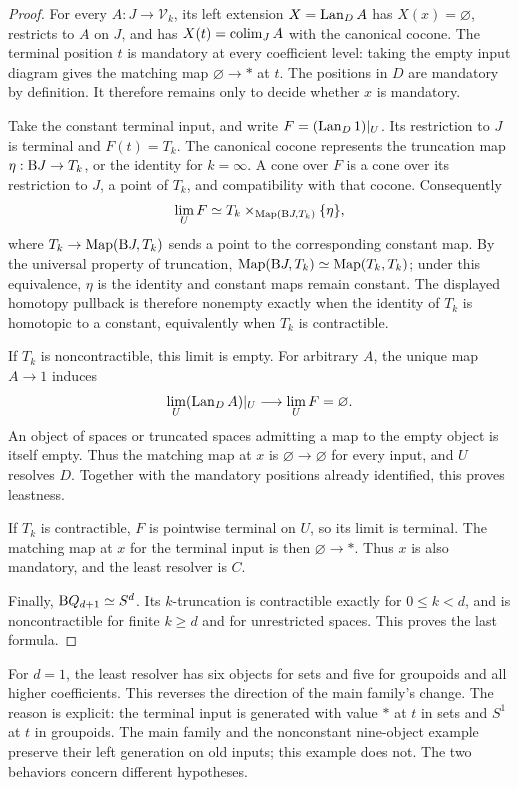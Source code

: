 \begin{proof}
For every $A:J\to\mathcal V_k$, its left extension $X=\operatorname{Lan}_D A$
has $X(x)=\varnothing$, restricts to $A$ on $J$, and has
$X(t)=\operatorname*{colim}_J A$ with the canonical cocone. The terminal position
$t$ is mandatory at every coefficient level: taking the empty input
diagram gives the matching map $\varnothing\to *$ at $t$. The
positions in $D$ are mandatory by definition. It therefore remains
only to decide whether $x$ is mandatory.

Take the constant terminal input, and write
$F=(\operatorname{Lan}_D1)|_U$. Its restriction to $J$ is terminal and
$F(t)=T_k$. The canonical cocone represents the truncation map
$\eta:\mathrm B J\to T_k$, or the identity for $k=\infty$. A cone over
$F$ is a cone over its restriction to $J$, a point of $T_k$, and
compatibility with that cocone. Consequently
\[
\operatorname*{lim}_U F\simeq
T_k\times_{\operatorname{Map}(\mathrm B J,T_k)}\{\eta\},
\]
where $T_k\to\operatorname{Map}(\mathrm B J,T_k)$ sends a point to the corresponding
constant map. By the universal property of truncation,
$\operatorname{Map}(\mathrm B J,T_k)\simeq\operatorname{Map}(T_k,T_k)$; under this equivalence,
$\eta$ is the identity and constant maps remain constant.
The displayed homotopy pullback is therefore nonempty exactly when
the identity of $T_k$ is homotopic to a constant, equivalently when
$T_k$ is contractible.

If $T_k$ is noncontractible, this limit is empty. For arbitrary
$A$, the unique map $A\to1$ induces
\[
\operatorname*{lim}_U(\operatorname{Lan}_D A)|_U\longrightarrow\operatorname*{lim}_U F=\varnothing.
\]
An object of spaces or truncated spaces admitting a map to the
empty object is itself empty. Thus the matching map at $x$ is
$\varnothing\to\varnothing$ for every input, and $U$ resolves $D$.
Together with the mandatory positions already identified, this
proves leastness.

If $T_k$ is contractible, $F$ is pointwise terminal on $U$, so its
limit is terminal. The matching map at $x$ for the terminal input
is then $\varnothing\to *$. Thus $x$ is also mandatory, and the
least resolver is $C$.

Finally, $\mathrm B Q_{d+1}\simeq S^d$. Its $k$-truncation is
contractible exactly for $0\leq k<d$, and is noncontractible for
finite $k\geq d$ and for unrestricted spaces. This proves the
last formula.
\end{proof}

For $d=1$, the least resolver has six objects for sets and five for
groupoids and all higher coefficients. This reverses the direction of
the main family's change. The reason is explicit: the terminal input
is generated with value $*$ at $t$ in sets and $S^1$ at $t$ in
groupoids. The main family and the nonconstant nine-object example
preserve their left generation on old inputs; this example does not.
The two behaviors concern different hypotheses.

